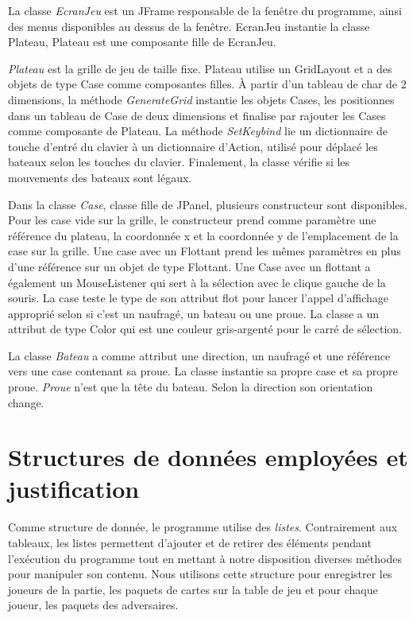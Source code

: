 \documentclass[11pt, french]{article} %
\begin{document}
La classe \textit{EcranJeu} est un JFrame responsable de la fenêtre du programme, ainsi des menus disponibles au dessus de la fenêtre. EcranJeu instantie la classe Plateau, Plateau est une composante fille de EcranJeu. 
\newline

\textit{Plateau} est la grille de jeu de taille fixe. Plateau utilise un GridLayout et a des objets de type Case comme composantes filles. À partir d'un tableau de char de 2 dimensions, la méthode \textit{GenerateGrid} instantie les objets Cases, les positionnes dans un tableau de Case de deux dimensions et finalise par rajouter les Cases comme composante de Plateau. La méthode \textit{SetKeybind} lie un dictionnaire de touche d'entré du clavier à un dictionnaire d'Action, utilisé pour déplacé les bateaux selon les touches du clavier. Finalement, la classe vérifie si les mouvements des bateaux sont légaux.
\newline

Dans la classe \textit{Case}, classe fille de JPanel, plusieurs constructeur sont disponibles. Pour les case vide sur la grille, le constructeur prend comme paramètre une référence du plateau, la coordonnée x et la coordonnée y de l'emplacement de la case sur la grille. Une case avec un Flottant prend les mêmes paramètres en plus d'une référence sur un objet de type Flottant. Une Case avec un flottant a également un MouseListener qui sert à la sélection avec le clique gauche de la souris. La case teste le type de son attribut flot pour lancer l'appel d'affichage approprié selon si c'est un naufragé, un bateau ou une proue. La classe a un attribut de type Color qui est une couleur gris-argenté pour le carré de sélection.
\newline

La classe \textit{Bateau} a comme attribut une direction, un naufragé et une référence vers une case contenant sa proue. La classe instantie sa propre case et sa propre proue. \textit{Proue} n'est que la tête du bateau. Selon la direction son orientation change.

\section{Structures de données employées et justification}
\paragraph{}
Comme structure de donnée, le programme utilise des \textit{listes}. Contrairement aux tableaux, les listes permettent d'ajouter et de retirer des éléments pendant l'exécution du programme tout en mettant à notre disposition diverses méthodes pour manipuler son contenu. Nous utilisons cette structure pour enregistrer les joueurs de la partie, les paquets de cartes sur la table de jeu et pour chaque joueur, les paquets des adversaires.
\end{document}
